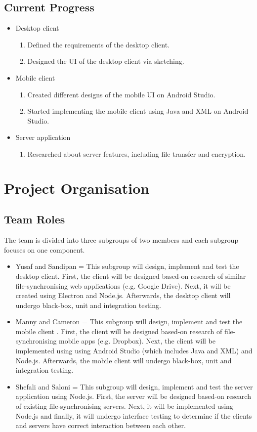 \documentclass{article}
\begin{document}
	\subsection{Current Progress}
	\begin{itemize}
	\item Desktop client
		\begin{enumerate}
		\item Defined the requirements of the desktop client.
		\item Designed the UI of the desktop client via sketching.
		\end{enumerate}
	\item Mobile client
		\begin{enumerate}
		\item Created different designs of the mobile UI on Android Studio.
		\item Started implementing the mobile client using Java and XML on Android Studio.  
		\end{enumerate}
	\item Server application
		\begin{enumerate}
		\item Researched about server features, including file transfer and encryption.
		\end{enumerate}
	\end{itemize}
\section{Project Organisation}
	\subsection{Team Roles}
	The team is divided into three subgroups of two members and each subgroup focuses on one component.
	\begin{itemize}
	\item Yusaf and Sandipan = This subgroup will design, implement and test the desktop client. First, the client will be designed based-on research of similar file-synchronising web applications (e.g. Google Drive). Next, it will be created using Electron and Node.js. Afterwards, the desktop client will undergo black-box, unit and integration testing. 
	\item Manny and Cameron = This subgroup will  design, implement and test the mobile client . First, the client will be designed based-on research of file-synchronising mobile apps (e.g. Dropbox). Next, the client will be implemented using using Android Studio (which includes Java and XML) and Node.js.  Afterwards, the mobile client will undergo black-box, unit and integration testing.
	\item Shefali and Saloni = This subgroup will design, implement and test the server application using Node.js. First, the server will be designed based-on research of existing file-synchronising servers. Next, it will be implemented using Node.js and finally, it will undergo interface testing to determine if the clients and servers have correct interaction between each other.
	\end{itemize}
\end{document}
